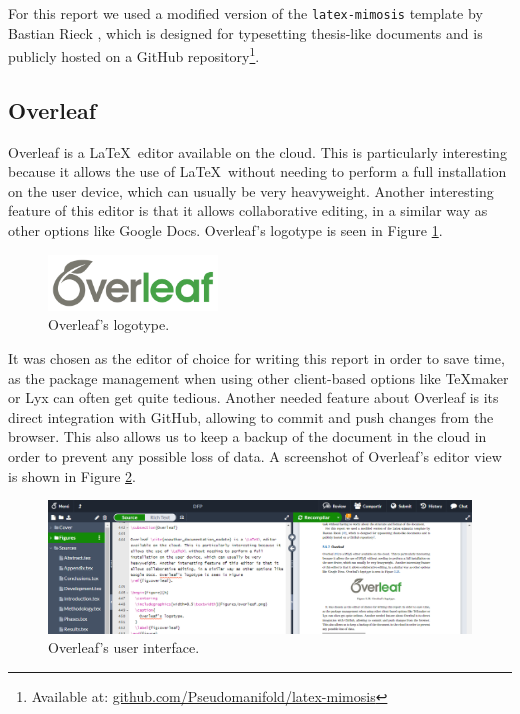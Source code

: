 For this report we used a modified version of the \texttt{latex-mimosis} template by Bastian Rieck \cite{rieck_latex-mimosis_2022}, which is designed for typesetting thesis-like documents and is publicly hosted on a GitHub repository\footnote{Available at: \url{github.com/Pseudomanifold/latex-mimosis}}.

\subsection{Overleaf}

Overleaf \cite{noauthor_documentation_nodate} is a \LaTeX\ editor available on the cloud. This is particularly interesting because it allows the use of \LaTeX\ without needing to perform a full installation on the user device, which can usually be very heavyweight. Another interesting feature of this editor is that it allows collaborative editing, in a similar way as other options like Google Docs. Overleaf's logotype is seen in Figure \ref{fig:overleaf}.

\begin{figure}[h]
  \centering
  \includegraphics[width=0.4\textwidth]{Figures/overleaf.png}
  \caption{
    Overleaf's logotype.
  }
  \label{fig:overleaf}
\end{figure}

It was chosen as the editor of choice for writing this report in order to save time, as the package management when using other client-based options like TeXmaker or Lyx can often get quite tedious. Another needed feature about Overleaf is its direct integration with GitHub, allowing to commit and push changes from the browser. This also allows us to keep a backup of the document in the cloud in order to prevent any possible loss of data. A screenshot of Overleaf's editor view is shown in Figure \ref{fig:overleaf-screen}.

\begin{figure}[h]
  \centering
  \includegraphics[width=\textwidth]{Figures/overleaf-screen.png}
  \caption{
    Overleaf's user interface.
  }
  \label{fig:overleaf-screen}
\end{figure}

